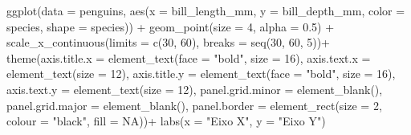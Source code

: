 \documentclass[
]{book}
\newenvironment{Shaded}{\begin{snugshade}}{\end{snugshade}}
\newcommand{\AttributeTok}[1]{\textcolor[rgb]{0.61,0.61,0.61}{#1}}
\newcommand{\ConstantTok}[1]{\textcolor[rgb]{0,0,0}{#1}}
\newcommand{\DecValTok}[1]{\textcolor[rgb]{0.06,0.06,0.06}{#1}}
\newcommand{\FloatTok}[1]{\textcolor[rgb]{0.06,0.06,0.06}{#1}}
\newcommand{\FunctionTok}[1]{\textcolor[rgb]{0,0,0}{#1}}
\newcommand{\NormalTok}[1]{#1}
\newcommand{\SpecialCharTok}[1]{\textcolor[rgb]{0,0,0}{#1}}
\newcommand{\StringTok}[1]{\textcolor[rgb]{0.5,0.5,0.5}{#1}}
\begin{document}
\begin{Shaded}
\begin{Highlighting}[]
\FunctionTok{ggplot}\NormalTok{(}\AttributeTok{data =}\NormalTok{ penguins, }
       \FunctionTok{aes}\NormalTok{(}\AttributeTok{x =}\NormalTok{ bill\_length\_mm, }
           \AttributeTok{y =}\NormalTok{ bill\_depth\_mm,}
           \AttributeTok{color =}\NormalTok{ species,}
           \AttributeTok{shape =}\NormalTok{ species)) }\SpecialCharTok{+}
  \FunctionTok{geom\_point}\NormalTok{(}\AttributeTok{size =} \DecValTok{4}\NormalTok{, }\AttributeTok{alpha =} \FloatTok{0.5}\NormalTok{) }\SpecialCharTok{+}
  \FunctionTok{scale\_x\_continuous}\NormalTok{(}\AttributeTok{limits =} \FunctionTok{c}\NormalTok{(}\DecValTok{30}\NormalTok{, }\DecValTok{60}\NormalTok{), }\AttributeTok{breaks =} \FunctionTok{seq}\NormalTok{(}\DecValTok{30}\NormalTok{, }\DecValTok{60}\NormalTok{, }\DecValTok{5}\NormalTok{))}\SpecialCharTok{+}
  \FunctionTok{theme}\NormalTok{(}\AttributeTok{axis.title.x =} \FunctionTok{element\_text}\NormalTok{(}\AttributeTok{face =} \StringTok{"bold"}\NormalTok{, }\AttributeTok{size =} \DecValTok{16}\NormalTok{),}
        \AttributeTok{axis.text.x =} \FunctionTok{element\_text}\NormalTok{(}\AttributeTok{size =} \DecValTok{12}\NormalTok{),}
        \AttributeTok{axis.title.y =} \FunctionTok{element\_text}\NormalTok{(}\AttributeTok{face =} \StringTok{"bold"}\NormalTok{, }\AttributeTok{size =} \DecValTok{16}\NormalTok{),}
        \AttributeTok{axis.text.y =} \FunctionTok{element\_text}\NormalTok{(}\AttributeTok{size =} \DecValTok{12}\NormalTok{),}
        \AttributeTok{panel.grid.minor =} \FunctionTok{element\_blank}\NormalTok{(),}
        \AttributeTok{panel.grid.major =} \FunctionTok{element\_blank}\NormalTok{(),}
        \AttributeTok{panel.border =} \FunctionTok{element\_rect}\NormalTok{(}\AttributeTok{size =} \DecValTok{2}\NormalTok{, }\AttributeTok{colour =} \StringTok{"black"}\NormalTok{, }\AttributeTok{fill =} \ConstantTok{NA}\NormalTok{))}\SpecialCharTok{+}
  \FunctionTok{labs}\NormalTok{(}\AttributeTok{x =} \StringTok{"Eixo X"}\NormalTok{, }\AttributeTok{y =} \StringTok{"Eixo Y"}\NormalTok{)}


\end{Highlighting}
\end{Shaded}
\end{document}
